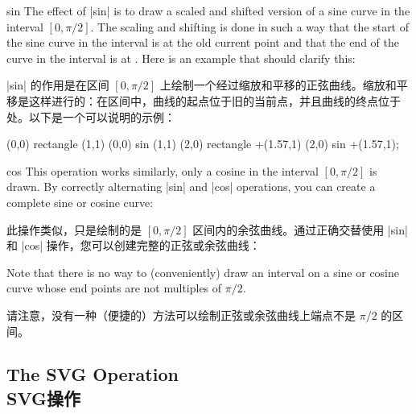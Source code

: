 \begin{pathoperation}{sin}{}
    The effect of |sin| is to draw a scaled and shifted version of a sine curve
    in the interval $[0,\pi/2]$. The scaling and shifting is done in such a way
    that the start of the sine curve in the interval is at the old current
    point and that the end of the curve in the interval is at
    . Here is an example that should clarify this:

    |sin| 的作用是在区间 $[0,\pi/2]$ 上绘制一个经过缩放和平移的正弦曲线。缩放和平移是这样进行的：在区间中，曲线的起点位于旧的当前点，并且曲线的终点位于处。以下是一个可以说明的示例：
\begin{codeexample}[]
\tikz \draw (0,0) rectangle (1,1)     (0,0) sin (1,1)
            (2,0) rectangle +(1.57,1) (2,0) sin +(1.57,1);
\end{codeexample}
\end{pathoperation}

\begin{pathoperation}{cos}{}
    This operation works similarly, only a cosine in the interval $[0,\pi/2]$
    is drawn. By correctly alternating |sin| and |cos| operations, you can
    create a complete sine or cosine curve:

    此操作类似，只是绘制的是 $[0,\pi/2]$ 区间内的余弦曲线。通过正确交替使用 |sin| 和 |cos| 操作，您可以创建完整的正弦或余弦曲线：

\begin{codeexample}[]
\end{codeexample}
\end{pathoperation}

Note that there is no way to (conveniently) draw an interval on a sine or
cosine curve whose end points are not multiples of $\pi/2$.

请注意，没有一种（便捷的）方法可以绘制正弦或余弦曲线上端点不是 $\pi/2$ 的区间。


\subsection{The SVG Operation\\SVG操作}


